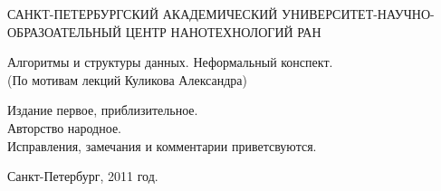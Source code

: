 \begin{titlepage}
\newpage

\begin{center}
САНКТ-ПЕТЕРБУРГСКИЙ АКАДЕМИЧЕСКИЙ УНИВЕРСИТЕТ-НАУЧНО-ОБРАЗОАТЕЛЬНЫЙ ЦЕНТР НАНОТЕХНОЛОГИЙ РАН
\end{center}
\hrulefill


\vspace{8em}

\begin{center}
\Large Алгоритмы и структуры данных. Неформальный конспект. \\ (По мотивам лекций Куликова Александра)
\end{center}

\vspace{2.5em}

\begin{flushleft}
Издание первое, приблизительное. \\
Авторство народное. \\
Исправления, замечания и комментарии приветсвуются.
\end{flushleft}

\vspace{\fill}

\begin{center}
Санкт-Петербург, 2011 год.
\end{center}

\end{titlepage}
